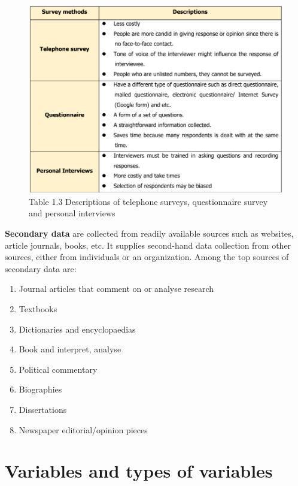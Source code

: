 \documentclass[
  a4paper,
  DIV=11,
  numbers=noendperiod,
  oneside]{scrreprt}
\providecommand{\tightlist}{%
  \setlength{\itemsep}{0pt}\setlength{\parskip}{0pt}}\usepackage{longtable,booktabs,array}
\begin{document}
\begin{figure}

{\centering \includegraphics[width=5.20833in,height=\textheight]{images/ch1/Picture7.png}

}

\caption{Table 1.3 Descriptions of telephone surveys, questionnaire
survey and personal interviews}

\end{figure}

\textbf{Secondary data} are collected from readily available sources
such as websites, article journals, books, etc. It supplies second-hand
data collection from other sources, either from individuals or an
organization. Among the top sources of secondary data are:

\begin{enumerate}
\def\labelenumi{\alph{enumi})}
\tightlist
\item
  Journal articles that comment on or analyse research
\item
  Textbooks
\item
  Dictionaries and encyclopaedias
\item
  Book and interpret, analyse
\item
  Political commentary
\item
  Biographies
\item
  Dissertations
\item
  Newspaper editorial/opinion pieces
\end{enumerate}

\hypertarget{variables-and-types-of-variables}{%
\section{Variables and types of
variables}\label{variables-and-types-of-variables}}
\end{document}
